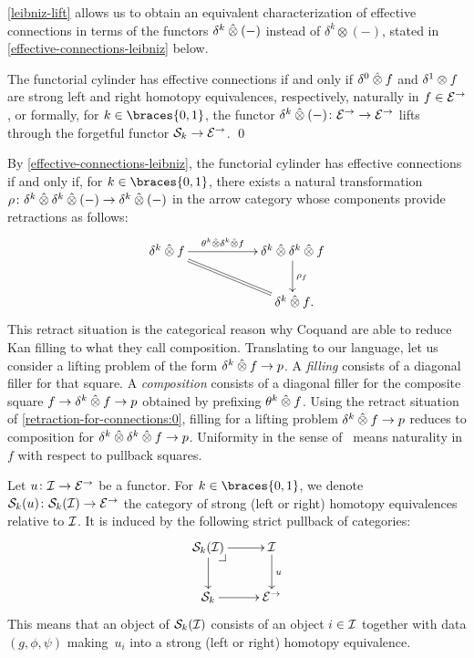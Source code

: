 \documentclass[reqno,10pt,a4paper,oneside,draft]{amsart}
\begin{document}
\cref{leibniz-lift} allows us to obtain an equivalent characterization of effective connections in terms of the functors $\delta^k \hatotimes (-)$ instead of $\delta^k \otimes (-)$, stated in \cref{effective-connections-leibniz} below.

\begin{corollary} \label{effective-connections-leibniz}
The functorial cylinder has effective connections if and only if $\lcyl \hatotimes f$ and $\rcyl \otimes f$ are strong left and right homotopy equivalences, respectively, naturally in $f \in \catE^\to$, or formally, for $k \in \braces{0, 1}$, the functor $\kcyl \hatotimes (-) \co \catE^\to \to \catE^\to$ lifts through the forgetful functor $\cal{S}_k \to \catE^\to$.
\qed
\end{corollary}

\begin{remark} \label{retraction-for-connections}
By \cref{effective-connections-leibniz}, the functorial cylinder has effective connections if and only if, for $k \in \braces{0, 1}$, there exists a natural transformation $\rho \co \kcyl \hatotimes \kcyl \hatotimes (-) \to \kcyl \hatotimes (-)$ in the arrow category whose components provide retractions as follows:
\begin{equation} \label{retraction-for-connections:0}
\xymatrix@C+3em{
  \kcyl \hatotimes f
  \ar[r]^-{\thetak \hatotimes \kcyl \hatotimes f}
  \ar@{=}[dr]
&
  \kcyl \hatotimes \kcyl \hatotimes f
  \ar[d]^{\rho_f}
\\&
  \kcyl \hatotimes f
\rlap{.}}
\end{equation}
This retract situation is the categorical reason why Coquand \etal\cite{cohen-et-al:cubicaltt} are able to reduce Kan filling to what they call composition.
Translating to our language, let us consider a lifting problem of the form $\kcyl \hatotimes f \to p$.
A \emph{filling} consists of a diagonal filler for that square.
A \emph{composition} consists of a diagonal filler for the composite square $f \to \kcyl \hatotimes f \to p$ obtained by prefixing $\theta^k \hatotimes f$.
Using the retract situation of \eqref{retraction-for-connections:0}, filling for a lifting problem $\kcyl \hatotimes f \to p$ reduces to composition for $\kcyl \hatotimes \kcyl \hatotimes f \to p$.
Uniformity in the sense of~\cite{cohen-et-al:cubicaltt} means naturality in $f$ with respect to pullback squares.
\end{remark}

Let $u \co \cal{I} \to \catE^\to$ be a functor.
For $k \in \braces{0, 1}$, we denote $\cal{S}_k(u) \co \cal{S}_k(\cal{I}) \to \catE^\to$ the category of strong (left or right) homotopy equivalences relative to $\cal{I}$.
It is induced by the following strict pullback of categories:
\[
\xymatrix{
  \cal{S}_k(\cal{I})
  \ar[r]
  \ar[d]
  \pullback{dr}
&
  \cal{I}
  \ar[d]^{u}
\\
  \cal{S}_k
  \ar[r]
&
  \catE^\to
}
\]
This means that an object of $\cal{S}_k(\cal{I})$ consists of an object $i \in \cal{I}$ together with data $(g, \phi, \psi)$ making~$u_i$ into a strong (left or right) homotopy equivalence.
\end{document}
